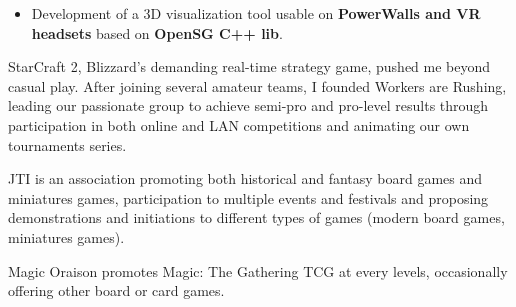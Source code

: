 \documentclass[10pt, a4paper, ragged2e]{altacv}
\begin{document}
		\smallskip
		\begin{itemize}
			\item Development of a 3D visualization tool usable on \textbf{PowerWalls and VR headsets} based on \textbf{OpenSG C++ lib}.
		\end{itemize}

\medskip
{}
		StarCraft 2, Blizzard’s demanding real-time strategy game, pushed me beyond casual play. After joining several amateur teams, I founded Workers are Rushing, leading our passionate group to achieve semi-pro and pro-level results through participation in both online and LAN competitions and animating our own tournaments series.

	\smallskip
	\divider

		JTI is an association promoting both historical and fantasy board games and miniatures games, participation to multiple events and festivals and proposing demonstrations and initiations to different types of games (modern board games, miniatures games).

	\smallskip
	\divider

		Magic Oraison promotes Magic: The Gathering TCG at every levels, occasionally offering other board or card games.
\end{document}
